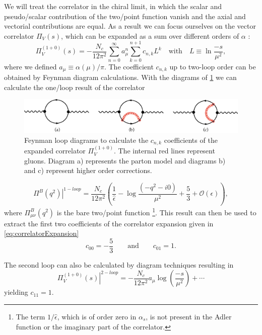 \documentclass[../../index.tex]{subfiles}
\begin{document}
We will treat the correlator in the chiral limit, in which the scalar and
pseudo\-/scalar contribution of the two\-/point function vanish and the axial
and vectorial contributions are equal. As a result we can focus ourselves on the
vector correlator \(\Pi_V(s)\), which can be expanded as a sum over different
orders of \(\alpha\) \cite{Beneke2008}:
\begin{equation}
  \label{eq:correlatorExpansion}
  \Pi_V^{(1+0)}(s) = - \frac{N_c}{12 \pi^2} \sum_{n=0}^\infty a_\mu^n \sum_{k=0}^{n+1} c_{n,k} L^{k} \quad \text{with} \quad L \equiv \ln \frac{-s}{\mu^2},
\end{equation}
where we defined \(a_\mu \equiv \alpha(\mu)/ \pi\). The coefficient \(c_{n,k}\)
up to two-loop order can be obtained by Feynman diagram calculations. With the
diagrams of \cref{fig:perturbativeContributionFeynmanDiagrams} we can calculate
the one\-/loop result of the correlator \cite{Jamin2006}
\begin{figure}
  \centering
  \includegraphics[width=\textwidth]{./images/correlatorLoopDiagrams.eps}
  \caption{Feynman loop diagrams to calculate the \(c_{n,k}\) coefficients of
    the expanded correlator \(\Pi_V^{(1+0)}\). The internal red lines represent
    gluons. Diagram a) represents the parton model and diagrams b) and c)
    represent higher order corrections.}
  \label{fig:perturbativeContributionFeynmanDiagrams}
\end{figure}
\begin{equation}
  \left. \Pi^B(q^2) \right\rvert^{1-loop} = \frac{N_c}{12\pi^2} \left( \frac{1}{\hat \epsilon} - \log\frac{(-q^2 - i0)}{\mu^2} + \frac{5}{3} + \mathcal{O}(\epsilon) \right),
\end{equation}
where \(\Pi^B_{\mu\nu}(q^2)\) is the bare two\-/point function \footnote{The
  term \(1/ \hat \epsilon\), which is of order zero in \(\alpha_s\), is not
  present in the Adler function or the imaginary part of the correlator.}. This
result can then be used to extract the first two coefficients of the correlator
expansion given in \cref{eq:correlatorExpansion}
\begin{equation}
  c_{00} = - \frac{5}{3} \qquad \text{and} \qquad c_{01} = 1.
\end{equation}

The second loop can also be calculated by diagram techniques resulting in
\cite{Boito2011}
\begin{equation}
  \left. \Pi_V^{(1+0)}(s) \right\rvert^{2-loop} = -\frac{N_c}{12\pi^2} a_\mu \log(\frac{-s}{\mu^2}) + \cdots
\end{equation}
yielding $c_{11} = 1$.
\end{document}
